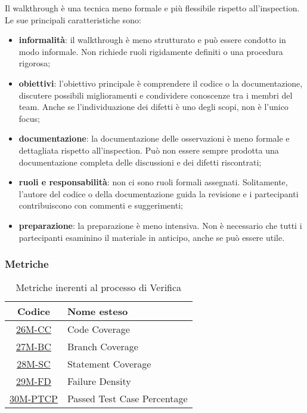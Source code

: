 Il walkthrough è una tecnica meno formale e più flessibile rispetto all'inspection. Le sue principali caratteristiche sono:
\begin{itemize}
	\item \textbf{informalità}: il walkthrough è meno strutturato e può essere condotto in modo informale. Non richiede ruoli rigidamente definiti o una procedura rigorosa;
	\item \textbf{obiettivi}: l'obiettivo principale è comprendere il codice o la documentazione, discutere possibili miglioramenti e condividere conoscenze tra i membri del team. Anche se l'individuazione dei difetti è uno degli scopi, non è l'unico focus;
	\item \textbf{documentazione}: la documentazione delle osservazioni è meno formale e dettagliata rispetto all'inspection. Può non essere sempre prodotta una documentazione completa delle discussioni e dei difetti riscontrati;
	\item \textbf{ruoli e responsabilità}: non ci sono ruoli formali assegnati. Solitamente, l'autore del codice o della documentazione guida la revisione e i partecipanti contribuiscono con commenti e suggerimenti;
	\item \textbf{preparazione}: la preparazione è meno intensiva. Non è necessario che tutti i partecipanti esaminino il materiale in anticipo, anche se può essere utile.
\end{itemize}

\subsubsection{Metriche}

\begin{table}[!h]
	\centering
	\begin{tabular}{|c|l|}
		\hline
		\textbf{Codice} & \textbf{Nome esteso}               					\\
		\hline
		\underline{\hyperlink{26M}{26M-CC}}     & Code Coverage   				\\
		\underline{\hyperlink{27M}{27M-BC}}     & Branch Coverage   			\\
		\underline{\hyperlink{28M}{28M-SC}}     & Statement Coverage   			\\
		\underline{\hyperlink{29M}{29M-FD}}     & Failure Density   			\\
		\underline{\hyperlink{30M}{30M-PTCP}}   & Passed Test Case Percentage   \\
		\hline
	\end{tabular}
	\caption{Metriche inerenti al processo di Verifica}
\end{table}



